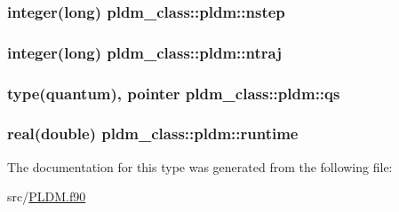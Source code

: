 \hypertarget{structpldm__class_1_1pldm_a4cf2258a15663bb09c8deaacc46f8feb}{
\subsubsection[{nstep}]{\setlength{\rightskip}{0pt plus 5cm}integer(long) pldm\+\_\+class\+::pldm\+::nstep\hspace{0.3cm}{\ttfamily [private]}}}\label{structpldm__class_1_1pldm_a4cf2258a15663bb09c8deaacc46f8feb}
\hypertarget{structpldm__class_1_1pldm_aab5aaef447d621035a2492d5c64aa965}{
\subsubsection[{ntraj}]{\setlength{\rightskip}{0pt plus 5cm}integer(long) pldm\+\_\+class\+::pldm\+::ntraj\hspace{0.3cm}{\ttfamily [private]}}}\label{structpldm__class_1_1pldm_aab5aaef447d621035a2492d5c64aa965}
\hypertarget{structpldm__class_1_1pldm_a928fc31d7c422b903cf8be2c66ecc8ab}{
\subsubsection[{qs}]{\setlength{\rightskip}{0pt plus 5cm}type(quantum), pointer pldm\+\_\+class\+::pldm\+::qs\hspace{0.3cm}{\ttfamily [private]}}}\label{structpldm__class_1_1pldm_a928fc31d7c422b903cf8be2c66ecc8ab}
\hypertarget{structpldm__class_1_1pldm_a6792078530b667f6e179e339ad3f705b}{
\subsubsection[{runtime}]{\setlength{\rightskip}{0pt plus 5cm}real(double) pldm\+\_\+class\+::pldm\+::runtime\hspace{0.3cm}{\ttfamily [private]}}}\label{structpldm__class_1_1pldm_a6792078530b667f6e179e339ad3f705b}


The documentation for this type was generated from the following file\+:\begin{DoxyCompactItemize}
\item 
src/\hyperlink{_p_l_d_m_8f90}{P\+L\+D\+M.\+f90}\end{DoxyCompactItemize}
